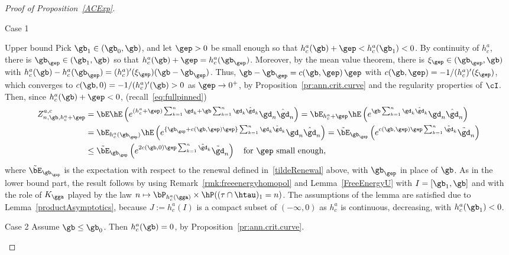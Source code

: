 \begin{proof}[Proof of Proposition~\ref{ACExp}]
\begin{step}{Case 1}
\begin{step}{Upper bound} Pick $\gb_1 \in (\gb_0,\gb)$, and let $\gep > 0$ be small enough so that $h_c^a(\gb) + \gep < h_c^a(\gb_1) < 0$. By continuity of $h_c^a$, there is $\gb_\gep \in (\gb_1,\gb)$ so that $h_c^a(\gb) + \gep = h_c^a(\gb_\gep)$. Moreover, by the mean value theorem, there is $\xi_\gep \in (\gb_\gep,\gb)$ with $h_c^a(\gb) - h_c^a(\gb_\gep) = (h_c^a)'(\xi_\gep) (\gb - \gb_\gep)$. Thus, $\gb - \gb_\gep = c(\gb,\gep) \, \gep$ with $c(\gb,\gep) = - 1/(h_c^a)'(\xi_\gep)$, which converges to $c(\gb,0) = - 1/(h_c^a)'(\gb) > 0$ as $\gep \to 0^+$, by Proposition~\ref{pr:ann.crit.curve} and the regularity properties of $\cI$. Then, since $h_c^a(\gb) + \gep < 0$, (recall~\eqref{eq:fullpinned})
\begin{equation}
\begin{aligned}
Z^{a,c}_{n,\gb,h_c^a + \gep} &= \bE \hE \left(e^{(h_c^a + \gep) \sum_{k=1}^n \gd_k + \gb \sum_{k=1}^n \gd_k \hat \gd_k} \gd_n \hat \gd_n \right) = \bE_{h_c^a + \gep} \hE \left(e^{\gb \sum_{k=1}^n \gd_k \hat \gd_k} \gd_n \hat \gd_n \right)\\
&= \bE_{h_c^a(\gb_\gep)} \hE \left(e^{\{\gb_\gep + c(\gb,\gep) \gep\} \sum_{k=1}^n \gd_k \hat \gd_k} \gd_n \hat \gd_n \right) = \tilde \bE_{\gb_\gep} \left(e^{c(\gb,\gep) \gep \sum_{k=1}^n \tilde \gd_k} \tilde \gd_n \right)\\
&\leq \tilde \bE_{\gb_\gep} \left(e^{2 c(\gb,0) \gep \sum_{k=1}^n \tilde \gd_k} \tilde \gd_n \right) \quad \text{for $\gep$ small enough,}
\end{aligned}
\end{equation}
where $\tilde \bE_{\gb_\gep}$ is the expectation with respect to the renewal defined in~\eqref{tildeRenewal} above, with $\gb_\gep$ in place of $\gb$. As in the lower bound part, the result follows by using Remark~\ref{rmk:freeenergyhomopol} and Lemma~\ref{FreeEnergyU} with $I = [\gb_1,\gb]$ and with the role of $K_\gga$ played by the law $n \mapsto \bP_{h_c^a(\gga)} \times \hP((\tau \cap \htau)_1 = n)$. The assumptions of the lemma are satisfied due to Lemma~\ref{productAsymptotics}, because $J := h_c^a(I)$ is a compact subset of $(- \infty,0)$ as $h_c^a$ is continuous, decreasing, with $h_c^a(\gb_1) < 0$.
\end{step}
\end{step}

\begin{step}{Case 2}
Assume $\gb \leq \gb_0$. Then $h_c^a(\gb) = 0$, by Proposition~\ref{pr:ann.crit.curve}.


\end{step}
\end{proof}
